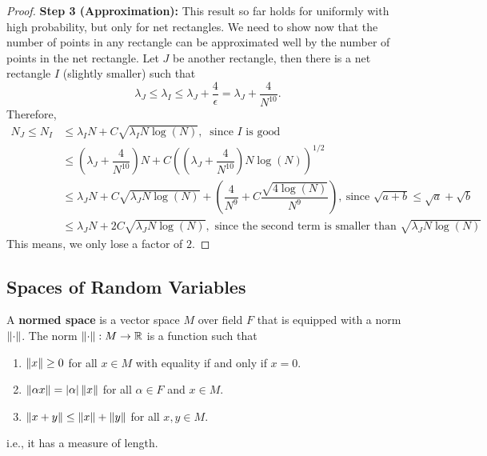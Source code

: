 \documentclass[12pt]{article}
\begin{document}
\begin{proof}
    \textbf{Step 3 (Approximation):} This result so far holds for uniformly with high probability, but only for net rectangles. We need to show now that the number of points in any rectangle can be approximated well by the number of points in the net rectangle. Let $J$ be another rectangle, then there is a net rectangle $I$ (slightly smaller) such that
    \begin{equation*}
        \lambda_J \leq \lambda_I \leq \lambda_J + \dfrac{4}{\epsilon} = \lambda_J + \dfrac{4}{N^{10}}.
    \end{equation*}
    \noindent Therefore,
    \begin{align*}
        N_J \leq N_I
         & \leq \lambda_I N + C\sqrt{\lambda_I N \log(N)}, \ \text{ since } I \text{ is good }                                                                                     \\
         & \leq \left( \lambda_J + \dfrac{4}{N^{10}} \right)N + C\left( \left( \lambda_J + \dfrac{4}{N^{10}} \right) N \log(N) \right)^{1/2}                                       \\
         & \leq \lambda_J N + C \sqrt{\lambda_J N \log(N)} + \left( \dfrac{4}{N^9} + C \dfrac{\sqrt{4\log(N)}}{N^9} \right), \ \text{since } \sqrt{a + b} \leq \sqrt{a} + \sqrt{b} \\
         & \leq \lambda_J N + 2 C\sqrt{\lambda_J N \log(N)}, \text{ since the second term is smaller than } \sqrt{\lambda_J N \log(N)}
    \end{align*}
    \noindent This means, we only lose a factor of $2$.
\end{proof}


\subsection{Spaces of Random Variables}

\begin{definitionbox}
    A \textbf{normed space} is a vector space $M$ over field $F$ that is equipped with a norm $\left\Vert \cdot \right\Vert$. The norm $\left\Vert \cdot \right\Vert : M \rightarrow \mathbb{R}$ is a function such that
    \begin{enumerate}
        \item $\left\Vert x \right\Vert \geq 0$ for all $x \in M$ with equality if and only if $x = 0$.
        \item $\left\Vert \alpha x \right\Vert = \left\lvert \alpha \right\rvert\left\Vert x \right\Vert$ for all $\alpha \in F$ and $x \in M$.
        \item $\left\Vert x + y \right\Vert \leq \left\Vert x \right\Vert + \left\Vert y \right\Vert$ for all $x, y \in M$.
    \end{enumerate}
    \noindent i.e., it has a measure of length.
\end{definitionbox}
\end{document}
